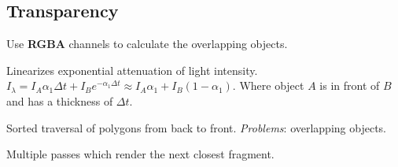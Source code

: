 \subsection{Transparency}

Use \textbf{RGBA} channels to calculate the overlapping objects.

\begin{algorithm}
  Linearizes exponential attenuation of light intensity.
  \(I_\lambda = I_A \alpha_1 \Delta t + I_Be^{-\alpha_1\Delta t} \approx I_A \alpha_1 + I_B(1 - \alpha_1)\).
  Where object \(A\) is in front of \(B\) and has a thickness of \(\Delta t\).
\end{algorithm}

\begin{definition}
  Sorted traversal of polygons from back to front.
  \textit{Problems}: overlapping objects.
\end{definition}

\begin{definition}
  Multiple passes which render the next closest fragment.
\end{definition}
